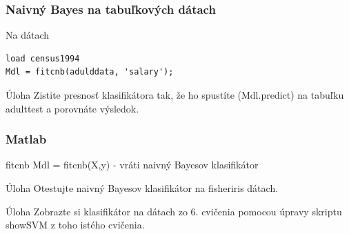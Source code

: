\documentclass{beamer}
\begin{document}
\begin{frame}[fragile]
\frametitle{Naivný Bayes na tabuľkových dátach}
\begin{block}{Na dátach}
\begin{verbatim}
load census1994
Mdl = fitcnb(adulddata, 'salary');\end{verbatim}
\end{block}

\begin{block}{Úloha}
Zistite presnosť klasifikátora tak, že ho spustíte (Mdl.predict) na tabuľku adulttest a porovnáte výsledok.
\end{block}
\end{frame}

\begin{frame}
\frametitle{Matlab}
\begin{block}{fitcnb}
Mdl = fitcnb(X,y) - vráti naivný Bayesov klasifikátor
\end{block}

\begin{block}{Úloha}
Otestujte naivný Bayesov klasifikátor na fisheriris dátach.
\end{block}

\begin{block}{Úloha}
Zobrazte si klasifikátor na dátach zo 6. cvičenia pomocou úpravy skriptu showSVM z toho istého cvičenia.
\end{block}
\end{frame}
\end{document}
